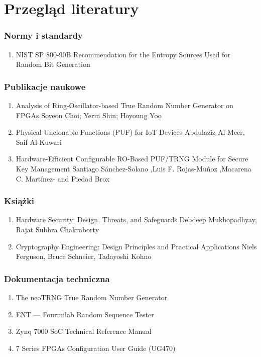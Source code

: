 \documentclass{beamer}
\begin{document}
\section{Przegląd literatury}
\begin{frame}
\frametitle{Normy i standardy}

\begin{enumerate}
    \item NIST SP 800-90B Recommendation for the Entropy Sources Used for Random Bit Generation
\end{enumerate}
\end{frame}
\begin{frame}
\frametitle{Publikacje naukowe}

\begin{enumerate}
    \item Analysis of Ring-Oscillator-based True Random Number Generator on FPGAs Soyeon Choi; Yerin Shin; Hoyoung Yoo
    \item Physical Unclonable Functions (PUF) for IoT Devices Abdulaziz Al-Meer, Saif Al-Kuwari
    \item Hardware-Efficient Configurable RO-Based PUF/TRNG Module for Secure Key Management Santiago Sánchez-Solano ,Luis F. Rojas-Muñoz ,Macarena C. Martínez- and Piedad Brox
\end{enumerate}
\end{frame}
\begin{frame}
\frametitle{Książki}

\begin{enumerate}
    \item Hardware Security: Design, Threats, and Safeguards
    Debdeep Mukhopadhyay, Rajat Subhra Chakraborty
    \item Cryptography Engineering: Design Principles and Practical Applications Niels Ferguson, Bruce Schneier, Tadayoshi Kohno
\end{enumerate}
\end{frame}
\begin{frame}
\frametitle{Dokumentacja techniczna}

\begin{enumerate}
    \item The neoTRNG True Random Number Generator
    \item ENT — Fourmilab Random Sequence Tester
    \item Zynq 7000 SoC Technical Reference Manual
    \item 7 Series FPGAs Configuration User Guide (UG470)
\end{enumerate}
\end{frame}
\begin{frame}
\frametitle{}
\end{frame}
\end{document}
